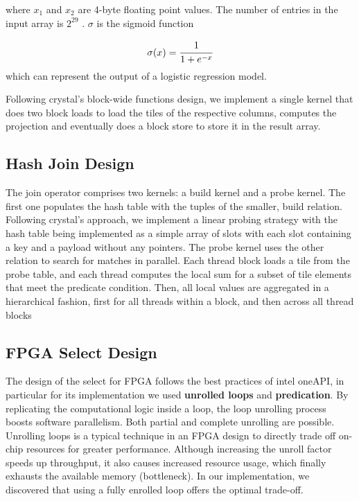 \documentclass[sigconf, nonacm]{acmart}
\begin{document}
where $x_1$ and $x_2$ are 4-byte floating point values. The
number of entries in the input array is $2^{29}$ . $\sigma$ is the sigmoid function 

$$ \sigma(x) = \cfrac{1}{1 + e^{-x}} $$
which can represent the output of a logistic regression model.

Following crystal's block-wide functions design, we implement a single kernel that does two block loads to load the tiles of the respective columns, computes the projection and eventually does a block store to store it in the result array.

\subsection{Hash Join Design}

The join operator comprises two kernels: a build kernel and a probe kernel. The first one populates the hash table with the tuples of the smaller, build relation. Following crystal's approach, we implement a linear probing strategy with the hash table being implemented as a simple array of slots with each slot containing a key and a payload without any pointers. The probe kernel uses the other relation to search for
matches in parallel. Each thread block loads a tile from the probe table, and each thread computes the local sum for a subset of tile elements that meet the predicate condition. Then, all local values are aggregated in a hierarchical fashion, first for all threads within a block, and then across all thread blocks

\subsection{FPGA Select Design}
The design of the select for FPGA follows the best practices of intel oneAPI\cite{githubOneAPIsamplesDirectProgrammingDPCFPGAReferenceDesignsdbMaster}, in particular for its implementation we used \textbf{unrolled loops} and \textbf{predication}.
By replicating the computational logic inside a loop, the loop unrolling process boosts software parallelism.
Both partial and complete unrolling are possible.
Unrolling loops is a typical technique in an FPGA design to directly trade off on-chip resources for greater performance.
Although increasing the unroll factor speeds up throughput, it also causes increased resource usage, which finally exhausts the available memory (bottleneck).
In our implementation, we discovered that using a fully enrolled loop offers the optimal trade-off.
\end{document}
